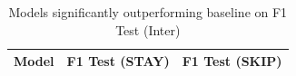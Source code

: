 \begin{table}[H]
\centering
\begin{tabular}{lcc}
\hline
Model & F1 Test (STAY) & F1 Test (SKIP) \\
\hline
\hline
\end{tabular}
\caption{Models significantly outperforming baseline on F1 Test (Inter)}
\label{tab:sig_f1_inter_ablation}
\end{table}

\vspace{1em}